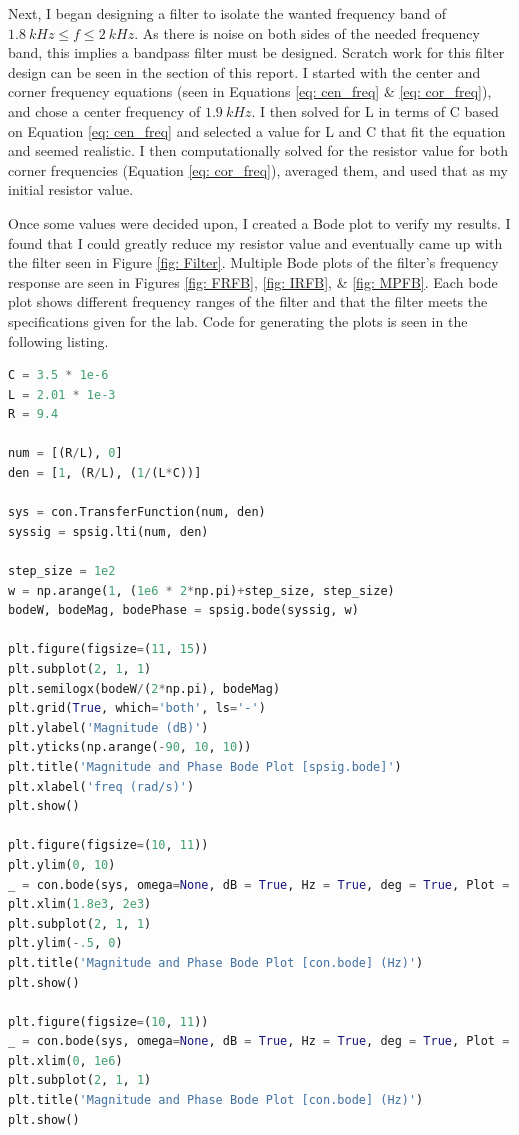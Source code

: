 \documentclass[12pt]{report}
\begin{document}
Next, I began designing a filter to isolate the wanted frequency band of $1.8\: kHz \leq f \leq 2\: kHz$. As there is 
noise on both sides of the needed frequency band, this implies a bandpass filter must be designed. Scratch work
for this filter design can be seen in the  section of this report. I started with the 
center and corner frequency equations (seen in Equations \eqref{eq: cen_freq} \& \eqref{eq: cor_freq}), and chose a center
frequency of $1.9\: kHz$. I then solved for L in terms of C based on Equation \eqref{eq: cen_freq} and selected a value
for L and C that fit the equation and seemed realistic. I then computationally solved for the resistor value for both 
corner frequencies (Equation \eqref{eq: cor_freq}), averaged them, and used that as my initial resistor value. 

Once some values were decided upon, I created a Bode plot to verify my results. I found that I could greatly reduce
my resistor value and eventually came up with the filter seen in Figure \ref{fig: Filter}. Multiple Bode plots of the 
filter's frequency response are seen in Figures \ref{fig: FRFB}, \ref{fig: IRFB}, \& \ref{fig: MPFB}. Each bode plot
shows different frequency ranges of the filter and that the filter meets the specifications given for the lab. Code 
for generating the plots is seen in the following listing.

\begin{lstlisting}[language=Python, basicstyle=\footnotesize]
C = 3.5 * 1e-6
L = 2.01 * 1e-3
R = 9.4

num = [(R/L), 0]
den = [1, (R/L), (1/(L*C))]

sys = con.TransferFunction(num, den)
syssig = spsig.lti(num, den)

step_size = 1e2
w = np.arange(1, (1e6 * 2*np.pi)+step_size, step_size)
bodeW, bodeMag, bodePhase = spsig.bode(syssig, w)

plt.figure(figsize=(11, 15))
plt.subplot(2, 1, 1)
plt.semilogx(bodeW/(2*np.pi), bodeMag)
plt.grid(True, which='both', ls='-')
plt.ylabel('Magnitude (dB)')
plt.yticks(np.arange(-90, 10, 10))
plt.title('Magnitude and Phase Bode Plot [spsig.bode]')
plt.xlabel('freq (rad/s)')
plt.show()

plt.figure(figsize=(10, 11))
plt.ylim(0, 10)
_ = con.bode(sys, omega=None, dB = True, Hz = True, deg = True, Plot = True)
plt.xlim(1.8e3, 2e3)
plt.subplot(2, 1, 1)
plt.ylim(-.5, 0)
plt.title('Magnitude and Phase Bode Plot [con.bode] (Hz)')
plt.show()

plt.figure(figsize=(10, 11))
_ = con.bode(sys, omega=None, dB = True, Hz = True, deg = True, Plot = True)
plt.xlim(0, 1e6)
plt.subplot(2, 1, 1)
plt.title('Magnitude and Phase Bode Plot [con.bode] (Hz)')
plt.show()
\end{lstlisting}
\end{document}
